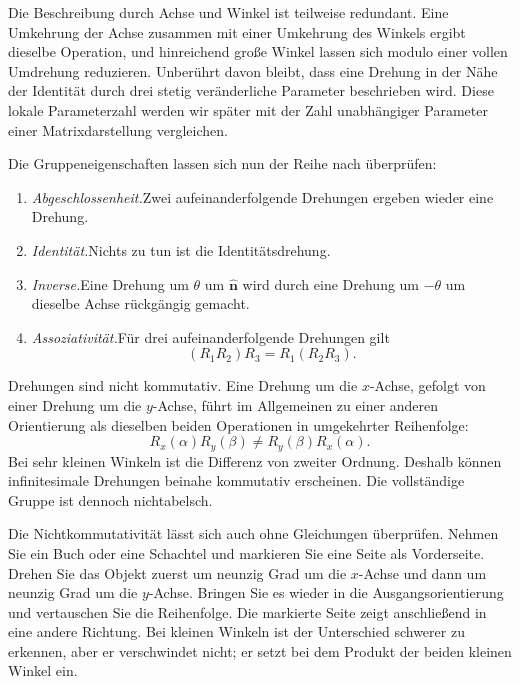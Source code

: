 Die Beschreibung durch Achse und Winkel ist teilweise redundant. Eine Umkehrung der Achse zusammen mit einer Umkehrung des Winkels ergibt dieselbe Operation, und hinreichend große Winkel lassen sich modulo einer vollen Umdrehung reduzieren. Unberührt davon bleibt, dass eine Drehung in der Nähe der Identität durch drei stetig veränderliche Parameter beschrieben wird. Diese lokale Parameterzahl werden wir später mit der Zahl unabhängiger Parameter einer Matrixdarstellung vergleichen.

Die Gruppeneigenschaften lassen sich nun der Reihe nach überprüfen:
\begin{enumerate}\item \emph{Abgeschlossenheit.}Zwei aufeinanderfolgende Drehungen ergeben wieder eine Drehung.
\item \emph{Identität.}Nichts zu tun ist die Identitätsdrehung.
\item \emph{Inverse.}Eine Drehung um \(\theta\) um \(\hat{\boldsymbol n}\) wird durch eine Drehung um \(-\theta\) um dieselbe Achse rückgängig gemacht.
\item \emph{Assoziativität.}Für drei aufeinanderfolgende Drehungen gilt
\[
(R_1R_2)R_3=R_1(R_2R_3).
\]\end{enumerate}

Drehungen sind nicht kommutativ. Eine Drehung um die \(x\)-Achse, gefolgt von einer Drehung um die \(y\)-Achse, führt im Allgemeinen zu einer anderen Orientierung als dieselben beiden Operationen in umgekehrter Reihenfolge:
\begin{equation}
R_x(\alpha)R_y(\beta)\ne R_y(\beta)R_x(\alpha).
\end{equation}
Bei sehr kleinen Winkeln ist die Differenz von zweiter Ordnung. Deshalb können infinitesimale Drehungen beinahe kommutativ erscheinen. Die vollständige Gruppe ist dennoch nichtabelsch.

Die Nichtkommutativität lässt sich auch ohne Gleichungen überprüfen. Nehmen Sie ein Buch oder eine Schachtel und markieren Sie eine Seite als Vorderseite. Drehen Sie das Objekt zuerst um neunzig Grad um die \(x\)-Achse und dann um neunzig Grad um die \(y\)-Achse. Bringen Sie es wieder in die Ausgangsorientierung und vertauschen Sie die Reihenfolge. Die markierte Seite zeigt anschließend in eine andere Richtung. Bei kleinen Winkeln ist der Unterschied schwerer zu erkennen, aber er verschwindet nicht; er setzt bei dem Produkt der beiden kleinen Winkel ein.

\begin{classroomqa}\end{classroomqa}

